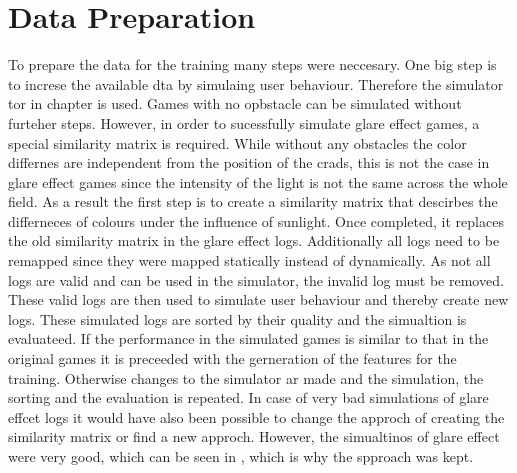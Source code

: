 \chapter{Data Preparation}
%	
%	
To prepare the data for the training many steps were neccesary. One big step is to increse the available dta by simulaing user behaviour. Therefore the simulator	tor in chapter  is used. Games with no opbstacle can be simulated without furteher steps. However, in order to sucessfully simulate glare effect games, a special similarity matrix is required. While without any obstacles the color differnes are independent from the position of the crads, this is not the case in glare effect games since the intensity of the light is not the same across the whole field. As a result the first step is to create a similarity matrix that descirbes the differneces of colours under the influence of sunlight. Once completed, it replaces the old similarity matrix in the glare effect logs. Additionally all logs need to be remapped since they were mapped statically instead of dynamically. As not all logs are valid and can be used in the simulator, the invalid log must be removed. These valid logs are then used to simulate user behaviour and thereby create new logs. These simulated logs are sorted by their quality and the simualtion is evaluateed. If the performance in the simulated games is similar to that in the original games it is preceeded with the gerneration of the features for the training. Otherwise changes to the simulator ar made and the simulation, the sorting and the evaluation is repeated. In case of very bad simulations of glare effcet logs it would have also been possible to change the approch of creating the similarity matrix or find a new approch. However, the simualtinos of glare effect were very good, which can be seen in , which is why the spproach was kept.

